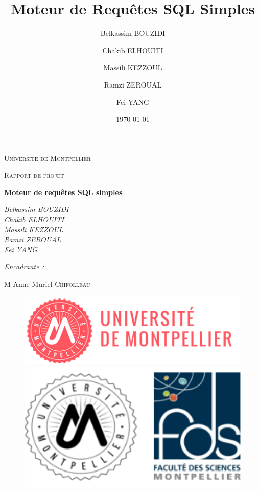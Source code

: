 \documentclass[oneside,13pt,a4paper]{report}
\title{Moteur de Requêtes SQL Simples}
\author{
    Belkassim BOUZIDI \and
    Chakib ELHOUITI \and
    Massili KEZZOUL \and
    Ramzi ZEROUAL \and
    Fei YANG
}
\date{\today}
\begin{document}
\begin{titlepage}
	\centering
	{\scshape\LARGE Universite de Montpellier\par}
	{\scshape\Large Rapport de projet\par}
	\vspace{1.5cm}
	{\huge\bfseries Moteur de requêtes SQL simples\par}
	\vspace{2cm}
	{\Large\itshape
		Belkassim BOUZIDI \\
		Chakib ELHOUITI \\
		Massili KEZZOUL \\
		Ramzi ZEROUAL \\
		Fei YANG \\
		\par}

	\vspace{1.5cm}

	{\Large\itshape
		Encadrante :\par
		M Anne-Muriel \textsc{Chifolleau}
		\par}

	\vspace{2cm}

	\begin{figure}[h]
		\begin{minipage}[c]{.46\linewidth}
			\centering
			\includegraphics[width=1\textwidth]{img/univ-montpellier.png}
		\end{minipage}
		\hfill%
		\begin{minipage}[c]{.46\linewidth}
			\centering
			\includegraphics[width=1\textwidth]{img/fds.png}
		\end{minipage}
	\end{figure}


\end{titlepage}
\end{document}
